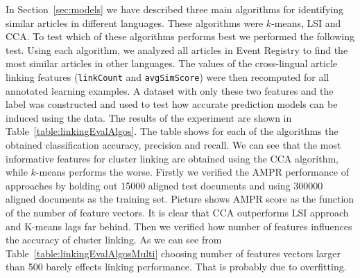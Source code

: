 \documentclass[twoside,11pt]{article}
\newcommand{\oldText}[1]{\textcolor{red}{#1:}\color{blue}}
\begin{document}
In Section~\ref{sec:models} we have described three main algorithms for identifying similar articles in different languages. These algorithms were $k$-means, LSI and CCA. To test which of these algorithms performs best we performed the following test. Using each algorithm, we analyzed all articles in Event Registry to find the most similar articles in other languages. The values of the cross-lingual article linking features (\texttt{linkCount} and \texttt{avgSimScore}) were then recomputed for all annotated learning examples. A dataset with only these two features and the label was constructed and used to test how accurate prediction models can be induced using the data. The results of the experiment are shown in Table~\ref{table:linkingEvalAlgos}. The table shows for each of the algorithms the obtained classification accuracy, precision and recall. We can see that the most informative features for cluster linking are obtained using the CCA algorithm, while $k$-means performs the worse. Firstly we verified the AMPR performance of approaches by holding out 15000 aligned test documents and using 300000 aligned documents
 as the training set. Picture \cite{pc:AMPR} shows AMPR score as the function of the number of feature vectors. It is clear that CCA outperforms LSI approach and K-means lags far behind.
Then we verified how number of features influences the accuracy of cluster linking. As we can see from Table~\ref{table:linkingEvalAlgosMulti} choosing number of features vectors larger than 500 barely effects linking performance. That is probably due to overfitting.
   
\end{document}
